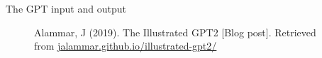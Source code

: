\documentclass[10pt]{beamer}
\begin{document}
\begin{frame}{The GPT input and output}
\begin{figure}[h]
\caption{Alammar, J (2019). The Illustrated GPT2 [Blog post]. Retrieved from \href{https://jalammar.github.io/illustrated-gpt2/}{jalammar.github.io/illustrated-gpt2/}
}
\end{figure}

\end{frame}
\end{document}
